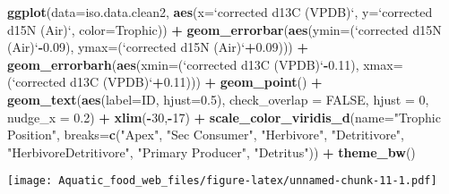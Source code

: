 \documentclass[]{article}
\newenvironment{Shaded}{\begin{snugshade}}{\end{snugshade}}
\newcommand{\KeywordTok}[1]{\textcolor[rgb]{0.13,0.29,0.53}{\textbf{#1}}}
\newcommand{\DataTypeTok}[1]{\textcolor[rgb]{0.13,0.29,0.53}{#1}}
\newcommand{\DecValTok}[1]{\textcolor[rgb]{0.00,0.00,0.81}{#1}}
\newcommand{\FloatTok}[1]{\textcolor[rgb]{0.00,0.00,0.81}{#1}}
\newcommand{\StringTok}[1]{\textcolor[rgb]{0.31,0.60,0.02}{#1}}
\newcommand{\OtherTok}[1]{\textcolor[rgb]{0.56,0.35,0.01}{#1}}
\newcommand{\OperatorTok}[1]{\textcolor[rgb]{0.81,0.36,0.00}{\textbf{#1}}}
\newcommand{\NormalTok}[1]{#1}
\begin{document}
\begin{Shaded}
\begin{Highlighting}[]
\KeywordTok{ggplot}\NormalTok{(}\DataTypeTok{data=}\NormalTok{iso.data.clean2, }\KeywordTok{aes}\NormalTok{(}\DataTypeTok{x=}\StringTok{`}\DataTypeTok{corrected d13C (VPDB)}\StringTok{`}\NormalTok{, }\DataTypeTok{y=}\StringTok{`}\DataTypeTok{corrected d15N (Air)}\StringTok{`}\NormalTok{, }\DataTypeTok{color=}\NormalTok{Trophic)) }\OperatorTok{+}\StringTok{ }
\StringTok{  }\KeywordTok{geom_errorbar}\NormalTok{(}\KeywordTok{aes}\NormalTok{(}\DataTypeTok{ymin=}\NormalTok{(}\StringTok{`}\DataTypeTok{corrected d15N (Air)}\StringTok{`}\OperatorTok{-}\FloatTok{0.09}\NormalTok{), }\DataTypeTok{ymax=}\NormalTok{(}\StringTok{`}\DataTypeTok{corrected d15N (Air)}\StringTok{`}\OperatorTok{+}\FloatTok{0.09}\NormalTok{))) }\OperatorTok{+}\StringTok{ }
\StringTok{  }\KeywordTok{geom_errorbarh}\NormalTok{(}\KeywordTok{aes}\NormalTok{(}\DataTypeTok{xmin=}\NormalTok{(}\StringTok{`}\DataTypeTok{corrected d13C (VPDB)}\StringTok{`}\OperatorTok{-}\FloatTok{0.11}\NormalTok{), }\DataTypeTok{xmax=}\NormalTok{(}\StringTok{`}\DataTypeTok{corrected d13C (VPDB)}\StringTok{`}\OperatorTok{+}\FloatTok{0.11}\NormalTok{))) }\OperatorTok{+}\StringTok{ }
\StringTok{  }\KeywordTok{geom_point}\NormalTok{() }\OperatorTok{+}
\StringTok{  }\KeywordTok{geom_text}\NormalTok{(}\KeywordTok{aes}\NormalTok{(}\DataTypeTok{label=}\NormalTok{ID, }\DataTypeTok{hjust=}\FloatTok{0.5}\NormalTok{), }\DataTypeTok{check_overlap =} \OtherTok{FALSE}\NormalTok{, }\DataTypeTok{hjust =} \DecValTok{0}\NormalTok{, }\DataTypeTok{nudge_x =} \FloatTok{0.2}\NormalTok{) }\OperatorTok{+}\StringTok{ }\KeywordTok{xlim}\NormalTok{(}\OperatorTok{-}\DecValTok{30}\NormalTok{,}\OperatorTok{-}\DecValTok{17}\NormalTok{) }\OperatorTok{+}
\StringTok{  }\KeywordTok{scale_color_viridis_d}\NormalTok{(}\DataTypeTok{name=}\StringTok{"Trophic Position"}\NormalTok{, }\DataTypeTok{breaks=}\KeywordTok{c}\NormalTok{(}\StringTok{"Apex"}\NormalTok{, }\StringTok{"Sec Consumer"}\NormalTok{, }\StringTok{"Herbivore"}\NormalTok{, }\StringTok{"Detritivore"}\NormalTok{,}
                                                          \StringTok{"HerbivoreDetritivore"}\NormalTok{, }\StringTok{"Primary Producer"}\NormalTok{, }\StringTok{"Detritus"}\NormalTok{)) }\OperatorTok{+}\StringTok{ }\KeywordTok{theme_bw}\NormalTok{()}
\end{Highlighting}
\end{Shaded}

\texttt{[image: Aquatic\_food\_web\_files/figure-latex/unnamed-chunk-11-1.pdf]}
\end{document}
